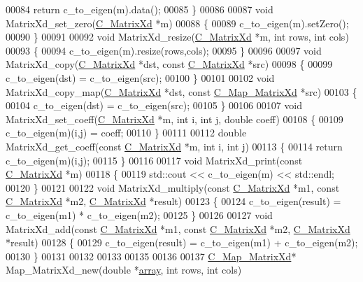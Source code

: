 \begin{DoxyCode}
00084   \textcolor{keywordflow}{return} c\_to\_eigen(m).data();
00085 \}
00086 
00087 \textcolor{keywordtype}{void} MatrixXd\_set\_zero(\hyperlink{struct_c___matrix_xd}{C\_MatrixXd} *m)
00088 \{
00089   c\_to\_eigen(m).setZero();
00090 \}
00091 
00092 \textcolor{keywordtype}{void} MatrixXd\_resize(\hyperlink{struct_c___matrix_xd}{C\_MatrixXd} *m, \textcolor{keywordtype}{int} rows, \textcolor{keywordtype}{int} cols)
00093 \{
00094   c\_to\_eigen(m).resize(rows,cols);
00095 \}
00096 
00097 \textcolor{keywordtype}{void} MatrixXd\_copy(\hyperlink{struct_c___matrix_xd}{C\_MatrixXd} *dst, \textcolor{keyword}{const} \hyperlink{struct_c___matrix_xd}{C\_MatrixXd} *src)
00098 \{
00099   c\_to\_eigen(dst) = c\_to\_eigen(src);
00100 \}
00101 
00102 \textcolor{keywordtype}{void} MatrixXd\_copy\_map(\hyperlink{struct_c___matrix_xd}{C\_MatrixXd} *dst, \textcolor{keyword}{const} \hyperlink{struct_c___map___matrix_xd}{C\_Map\_MatrixXd} *src)
00103 \{
00104   c\_to\_eigen(dst) = c\_to\_eigen(src);
00105 \}
00106 
00107 \textcolor{keywordtype}{void} MatrixXd\_set\_coeff(\hyperlink{struct_c___matrix_xd}{C\_MatrixXd} *m, \textcolor{keywordtype}{int} i, \textcolor{keywordtype}{int} j, \textcolor{keywordtype}{double} coeff)
00108 \{
00109   c\_to\_eigen(m)(i,j) = coeff;
00110 \}
00111 
00112 \textcolor{keywordtype}{double} MatrixXd\_get\_coeff(\textcolor{keyword}{const} \hyperlink{struct_c___matrix_xd}{C\_MatrixXd} *m, \textcolor{keywordtype}{int} i, \textcolor{keywordtype}{int} j)
00113 \{
00114   \textcolor{keywordflow}{return} c\_to\_eigen(m)(i,j);
00115 \}
00116 
00117 \textcolor{keywordtype}{void} MatrixXd\_print(\textcolor{keyword}{const} \hyperlink{struct_c___matrix_xd}{C\_MatrixXd} *m)
00118 \{
00119   std::cout << c\_to\_eigen(m) << std::endl;
00120 \}
00121 
00122 \textcolor{keywordtype}{void} MatrixXd\_multiply(\textcolor{keyword}{const} \hyperlink{struct_c___matrix_xd}{C\_MatrixXd} *m1, \textcolor{keyword}{const} \hyperlink{struct_c___matrix_xd}{C\_MatrixXd} *m2, 
      \hyperlink{struct_c___matrix_xd}{C\_MatrixXd} *result)
00123 \{
00124   c\_to\_eigen(result) = c\_to\_eigen(m1) * c\_to\_eigen(m2);
00125 \}
00126 
00127 \textcolor{keywordtype}{void} MatrixXd\_add(\textcolor{keyword}{const} \hyperlink{struct_c___matrix_xd}{C\_MatrixXd} *m1, \textcolor{keyword}{const} \hyperlink{struct_c___matrix_xd}{C\_MatrixXd} *m2, 
      \hyperlink{struct_c___matrix_xd}{C\_MatrixXd} *result)
00128 \{
00129   c\_to\_eigen(result) = c\_to\_eigen(m1) + c\_to\_eigen(m2);
00130 \}
00131 
00132 
00133 
00135 
00136 
00137 \hyperlink{struct_c___map___matrix_xd}{C\_Map\_MatrixXd}* Map\_MatrixXd\_new(\textcolor{keywordtype}{double} *\hyperlink{class_eigen_1_1array}{array}, \textcolor{keywordtype}{int} rows, \textcolor{keywordtype}{int} cols)

\end{DoxyCode}
